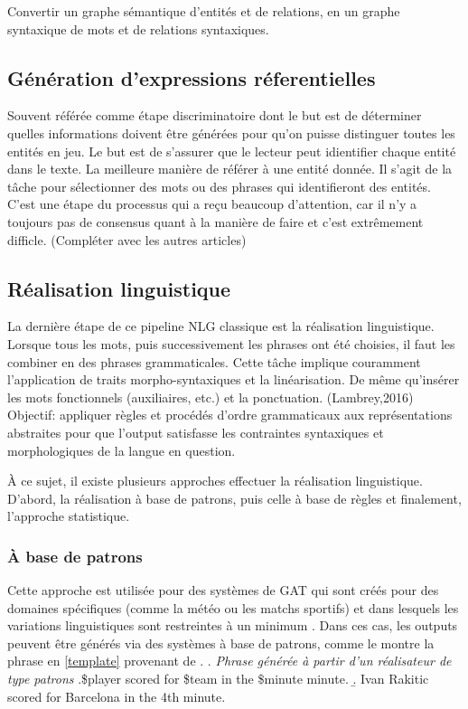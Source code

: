 Convertir un graphe sémantique d'entités et de relations, en un graphe syntaxique de mots et de relations syntaxiques. 

\subsection{Génération d'expressions réferentielles}
Souvent référée comme étape discriminatoire dont le but est de déterminer quelles informations doivent être générées pour qu'on puisse distinguer toutes les entités en jeu. Le but est de s'assurer que le lecteur peut idientifier chaque entité dans le texte. La meilleure manière de référer à une entité donnée.
Il s'agit de la tâche pour sélectionner des mots ou des phrases qui identifieront des entités. C'est une étape du processus qui a reçu beaucoup d'attention, car il n'y a toujours pas de consensus quant à la manière de faire et c'est extrêmement difficle. (Compléter avec les autres articles)

\subsection{Réalisation linguistique}
La dernière étape de ce pipeline NLG classique est la réalisation linguistique. Lorsque tous les mots, puis successivement les phrases ont été choisies, il faut les combiner en des phrases grammaticales. Cette tâche implique couramment l'application de traits morpho-syntaxiques et la linéarisation. De même qu'insérer les mots fonctionnels (auxiliaires, etc.) et la ponctuation. (Lambrey,2016) Objectif: appliquer règles et procédés d'ordre grammaticaux aux représentations abstraites pour que l'output satisfasse les contraintes syntaxiques et morphologiques de la langue en question.

À ce sujet, il existe plusieurs approches effectuer la réalisation linguistique. D'abord, la réalisation à base de patrons, puis celle à base de règles et finalement, l'approche statistique.

\subsubsection{À base de patrons}
Cette approche est utilisée pour des systèmes de \ac{GAT} qui sont créés pour des domaines spécifiques (comme la météo ou les matchs sportifs) et dans lesquels les variations linguistiques sont restreintes à un minimum \citep{mcroy_channarukul_ali_2003}. Dans ces cas, les outputs peuvent être générés via des systèmes à base de patrons, comme le montre la phrase en \ref{template} provenant de \citep{gatt18}.
\ex. \label{template} \emph{Phrase générée à partir d'un réalisateur de type patrons}
	\a.\$player scored for \$team in the \$minute minute. 
	\b. Ivan Rakitic scored for Barcelona in the 4th minute.

